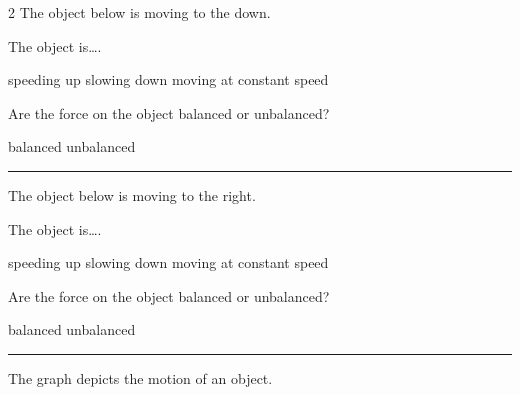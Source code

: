 \documentclass[]{exam}
\begin{document}
\begin{questions}
\begin{multicols*}{2}
\question
The object below is moving to the down.

\begin{center}
\end{center}

The object is\dots .

\begin{randomizechoices}[norandomize]
    \correctchoice speeding up
    \choice slowing down
    \choice moving at constant speed 
\end{randomizechoices}

\question 
Are the force on the object balanced or unbalanced?

\begin{randomizechoices}[norandomize]
    \choice balanced
    \correctchoice unbalanced
\end{randomizechoices}

\bigskip
\hrule

\question 
The object below is moving to the right.

\begin{center}
\end{center}

The object is\dots .

\begin{randomizechoices}[norandomize]
    \correctchoice speeding up
    \choice slowing down
    \choice moving at constant speed 
\end{randomizechoices}

\question 
Are the force on the object balanced or unbalanced?

\begin{randomizechoices}[norandomize]
    \choice balanced
    \correctchoice unbalanced
\end{randomizechoices}

\bigskip
\hrule

\vspace*{\fill}
\end{multicols*}

\question
The graph depicts the motion of an object.


\end{questions}
\end{document}
